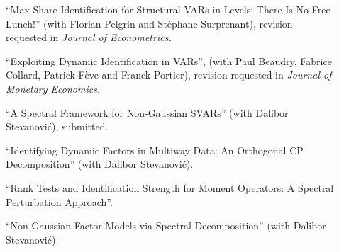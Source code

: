 %
\begin{description}
\item[] ``Max Share Identification for Structural VARs in Levels: There Is No Free Lunch!''
(with Florian Pelgrin and St\'ephane Surprenant), revision requested in {\it Journal of Econometrics.}

\item[] ``Exploiting Dynamic Identification in VARs'',
(with Paul Beaudry, Fabrice Collard, Patrick F\`eve
and Franck Portier), revision requested in {\it Journal of Monetary Economics.}

\item[] ``A Spectral Framework for Non-Gaussian SVARs''
(with Dalibor Stevanovi\'c), submitted.
\end{description}

\vspace{.5cm}

%
\begin{description}
\item[] ``Identifying Dynamic Factors in Multiway Data: An Orthogonal CP Decomposition''
(with Dalibor Stevanovi\'c).

\item[] ``Rank Tests and Identification Strength for Moment Operators: A Spectral Perturbation Approach''.

\item[] ``Non-Gaussian Factor Models via Spectral Decomposition''
(with Dalibor Stevanovi\'c).
\end{description}
%



\vspace{.5cm}


 \vspace{.3 cm}



